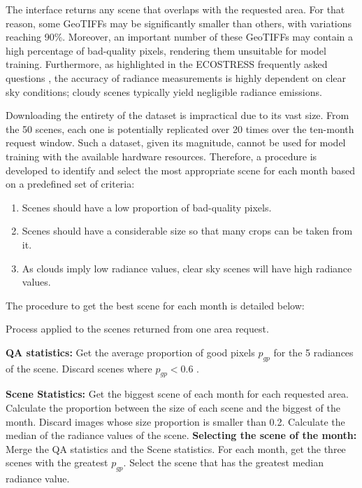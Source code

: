 The interface returns any scene that overlaps with the requested area. For that reason, some GeoTIFFs may be significantly smaller than others, with variations reaching 90\%. Moreover, an important number of these GeoTIFFs may contain a high percentage of bad-quality pixels, rendering them unsuitable for model training. Furthermore, as highlighted in the ECOSTRESS frequently asked questions \cite{ecostress_faq}, the accuracy of radiance measurements is highly dependent on clear sky conditions; cloudy scenes typically yield negligible radiance emissions.

Downloading the entirety of the dataset is impractical due to its vast size.  
From the 50 scenes, each one is potentially replicated over 20 times over the ten-month request window.
Such a dataset, given its magnitude, cannot be used for model training with the available hardware resources.
Therefore, a procedure is developed to identify and select the most appropriate scene for each month based on a predefined set of criteria:

\begin{enumerate}
\item Scenes should have a low proportion of bad-quality pixels.
\item Scenes should have a considerable size so that many crops can be taken from it.
\item As clouds imply low radiance values, clear sky scenes will have high radiance values.
\end{enumerate}


The procedure to get the best scene for each month is detailed below: 

\begin{algorithm}
\caption{Process applied to the scenes returned from one area request.}
\begin{algorithmic}[1]

\State \textbf{QA statistics:}
\State Get the average proportion of good pixels $p_{gp}$ for the 5 radiances of the scene.
\State Discard scenes where $p_{gp} < 0.6 $ .

\State \textbf{Scene Statistics:}
\State Get the biggest scene of each month for each requested area.
\State Calculate the proportion between the size of each scene and the biggest of the month.
\State Discard images whose size proportion is smaller than 0.2.
\State Calculate the median of the radiance values of the scene.
\State \textbf{Selecting the scene of the month:}
\State Merge the QA statistics and the Scene statistics.
\State For each month, get the three scenes with the greatest $p_{gp}$.
\State Select the scene that has the greatest median radiance value.
\end{algorithmic}
\end{algorithm}

